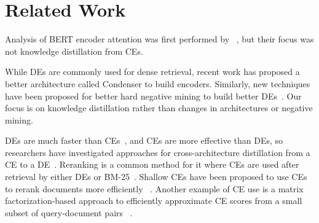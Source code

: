 \section{Related Work}
Analysis of BERT encoder attention was first performed by ~\cite{clark2019doesbertlookat}, but their focus was not knowledge distillation from CEs.

While DEs are commonly used for dense retrieval, recent work \cite{gao2021condenserpretrainingarchitecturedense} has proposed a better architecture called Condenser to build encoders.  Similarly, new techniques have been proposed for better hard negative mining to build better DEs~\cite{conf/iclr/XiongXLTLBAO21,DBLP:conf/naacl/QuDLLRZDWW21}.  Our focus is on knowledge distillation rather than changes in architectures or negative mining.   

DEs are much faster than CEs~\cite{humeau2019poly}, and CEs are more effective than DEs, so researchers have investigated approaches for cross-architecture distillation from a CE to a DE~\cite{Hofstatter2020,karpukhin2020densepassageretrievalopendomain,lu2022ernie,rauf2024bce4zsr}. Reranking is a common method for it where CEs are used after retrieval by either DEs or BM-25~\cite{YilmazYZL19,Nogueira2019,LogeswaranCLTDL19, gao2021rethinktrainingbertrerankers}. Shallow CEs have been proposed to use CEs to rerank documents more efficiently ~\cite{PetrovMM24}. Another example of CE use is a matrix factorization-based approach to efficiently approximate CE scores from a small subset of query-document pairs ~\cite{yadav2022efficient}. 
%

%
%
%


